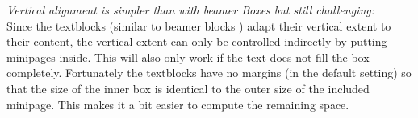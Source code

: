 

 
\alert{\textit{Vertical alignment is simpler than with beamer Boxes but still challenging:}}
\\
Since the textblocks (similar to  beamer blocks ) adapt their vertical extent to their content,
the vertical extent can only be controlled indirectly by putting minipages inside.
This will also only work if the text does not fill the box completely.
Fortunately the textblocks have no margins (in the default setting) so that the
size of the inner box is identical to the outer size of the included minipage.
This makes it a bit easier to compute the remaining space.


%  
%  
%  
%
